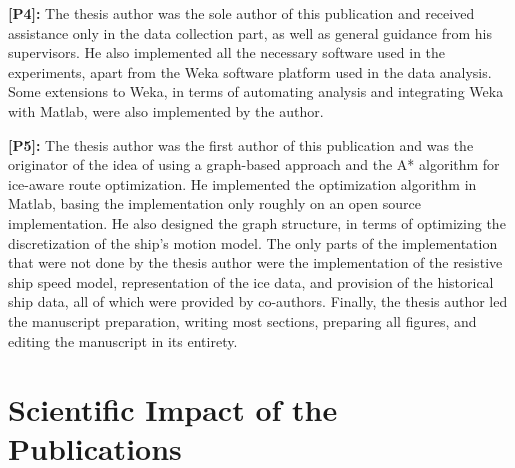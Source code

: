 \textbf{[P4]:} The thesis author was the sole author of this publication and received assistance only in the data collection part, as well as general guidance from his supervisors. He also implemented all the necessary software used in the experiments, apart from the Weka software platform used in the data analysis. Some extensions to Weka, in terms of automating analysis and integrating Weka with Matlab, were also implemented by the author.

\textbf{[P5]:} The thesis author was the first author of this publication and was the originator of the idea of using a graph-based approach and the A* algorithm for ice-aware route optimization. He implemented the optimization algorithm in Matlab, basing the implementation only roughly on an open source implementation. He also designed the graph structure, in terms of optimizing the discretization of the ship's motion model. The only parts of the implementation that were not done by the thesis author were the implementation of the resistive ship speed model, representation of the ice data, and provision of the historical ship data, all of which were provided by co-authors. Finally, the thesis author led the manuscript preparation, writing most sections, preparing all figures, and editing the manuscript in its entirety.

\section{Scientific Impact of the Publications}
\label{sec:impact}

